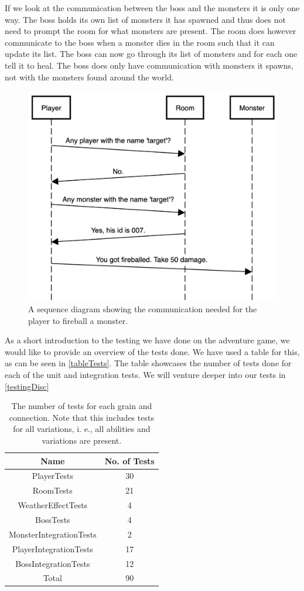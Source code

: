 If we look at the communication between the boss and the monsters it is only one way. The boss holds its own list of monsters it has spawned and thus does not need to prompt the room for what monsters are present. The room does however communicate to the boss when a monster dies in the room such that it can update its list. The boss can now go through its list of monsters and for each one tell it to heal. The boss does only have communication with monsters it spawns, not with the monsters found around the world.\\

\begin{figure}[H]
	\centering
	\includegraphics[width=0.7\linewidth]{Materials/Adventuregame/SequenceDiagram}
	\caption{A sequence diagram showing the communication needed for the player to fireball a monster.}
	\label{PLayerFireballFlow}
\end{figure}

As a short introduction to the testing we have done on the adventure game, we would like to provide an overview of the tests done. We have used a table for this, as can be seen in \autoref{tableTests}. The table showcases the number of tests done for each of the unit and integration tests. We will venture deeper into our tests in \autoref{testingDisc}
\begin{table}[H]
	\centering
	\begin{tabular}{| c | c |} \hline
		\textbf{Name} & \textbf{No. of Tests} \\ \hline
		PlayerTests & 30 \\ \hline
		RoomTests & 21 \\ \hline
		WeatherEffectTests & 4 \\ \hline
		BossTests & 4 \\ \hline
		MonsterIntegrationTests & 2 \\ \hline
		PlayerIntegrationTests & 17 \\ \hline
		BossIntegrationTests & 12 \\ \hline
		Total & 90 \\ \hline
	\end{tabular}
	\caption{The number of tests for each grain and connection. Note that this includes tests for all variations, i. e., all abilities and variations are present.}
	\label{tableTests}
\end{table}


